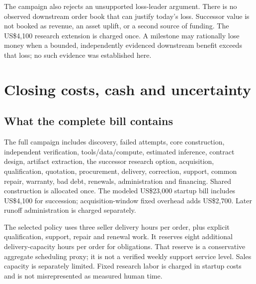 The campaign also rejects an unsupported loss-leader argument. There is no observed downstream order book that can justify today's loss. Successor value is not booked as revenue, an asset uplift, or a second source of funding. The US\$4,100 research extension is charged once. A milestone may rationally lose money when a bounded, independently evidenced downstream benefit exceeds that loss; no such evidence was established here.

\section{Closing costs, cash and uncertainty}
\subsection{What the complete bill contains}
The full campaign includes discovery, failed attempts, core construction, independent verification, tools/data/compute, estimated inference, contract design, artifact extraction, the successor research option, acquisition, qualification, quotation, procurement, delivery, correction, support, common repair, warranty, bad debt, renewals, administration and financing. Shared construction is allocated once. The modeled US\$23,000 startup bill includes US\$4,100 for succession; acquisition-window fixed overhead adds US\$2,700. Later runoff administration is charged separately.

The selected policy uses three seller delivery hours per order, plus explicit qualification, support, repair and renewal work. It reserves eight additional delivery-capacity hours per order for obligations. That reserve is a conservative aggregate scheduling proxy; it is not a verified weekly support service level. Sales capacity is separately limited. Fixed research labor is charged in startup costs and is not misrepresented as measured human time.


